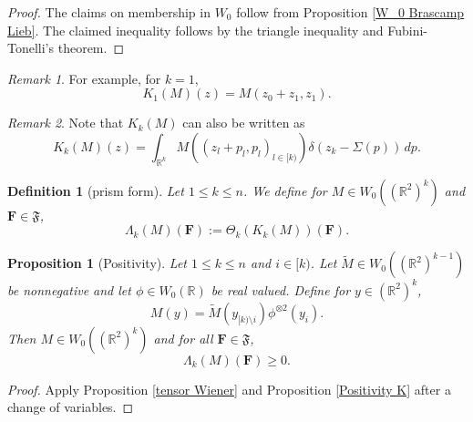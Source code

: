 \documentclass[12pt,reqno]{amsart}
\theoremstyle{plain}
\newtheorem{proposition}[theorem]{Proposition}
\newtheorem{definition}[theorem]{Definition}
\numberwithin{equation}{section}
\theoremstyle{remark}
\newtheorem{rem}{Remark}[section]
\newcommand{\using}[1]{}
\newcommand{\R}{{\mathbb R}}
\newcommand{\F}{\mathbf{F}}
\begin{document}
\begin{proof}
The claims on membership in $W_0$ follow from
Proposition \ref{W_0 Brascamp Lieb}.
The claimed inequality follows by the triangle inequality and Fubini-Tonelli's theorem.
\end{proof}

\begin{rem}
For example, for $k=1$,
\begin{equation}\label{auto:K-one-explicit-formula}K_1(M)(z)=M(z_0+z_1,z_1).\end{equation}
\end{rem}

\begin{rem}
Note that $K_k(M)$ can also be written as
\begin{equation}\label{kviam_2'}
    K_k(M)(z)=\int_{\R^{k}}  M((z_{l}+p_{l},p_{l})_{l\in[k)}) \delta( z_{k}-\Sigma(p))\,dp.
\end{equation}
\end{rem}

\begin{definition}[prism form]\label{auto:prism-form-definition}
Let $1\le k\le n$. We define for $M\in W_0((\R^2)^k)$ and $\mathbf{F}\in\mathfrak{F}$,
\begin{equation}\label{auto:prism-form-formula}\Lambda_k(M)(\mathbf{F}) := \Theta_k(K_k(M))(\mathbf{F}).\end{equation}
\end{definition}

\begin{proposition}[Positivity]\label{Positivity M}\using{tensor Wiener}\using{Positivity K}
Let $1\le k\le n$ and $i\in [k)$. Let $\tilde{M}\in W_0((\R^2)^{k-1})$ be nonnegative
and let $\phi\in W_0(\R)$ be real valued. Define for $y\in (\R^2)^k$,
\begin{equation}\label{auto:positive-prism-product-kernel}
    M(y)=\tilde{M}(y_{[k)\setminus i}) \phi^{\otimes 2}(y_{i}).
\end{equation}
Then $M\in W_0((\R^2)^k)$ and for all $\F\in {\mathfrak{F}}$,
\begin{equation}\label{auto:positive-prism-form}
    \Lambda_k(M)(\F)\ge 0.
\end{equation}
\end{proposition}

\begin{proof}
    Apply Proposition \ref{tensor Wiener} and Proposition \ref{Positivity K} after a change of variables.
\end{proof}
\end{document}

